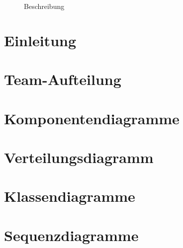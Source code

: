 \documentclass{report}
\begin{document}
	
	\begin{figure}[h]
		\centering
		\caption{Beschreibung}
		\label{fig:x}
	\end{figure}
		
	
	\tableofcontents 
	
	\chapter{Einleitung}\label{chp:einleitung}
	\thispagestyle{fancy}
	
	
	\chapter{Team-Aufteilung}
	\thispagestyle{fancy}
	
	
	\chapter{Komponentendiagramme}\label{chp:komponentendiagramme}
	\thispagestyle{fancy}
	
	
	\chapter{Verteilungsdiagramm}\label{chp:verteilungsdiagramm}
	\thispagestyle{fancy}
	
		
	\chapter{Klassendiagramme}\label{chp:klassendiagramme}
	\thispagestyle{fancy}
	
	
	\chapter{Sequenzdiagramme}\label{chp:sequenzdiagramme}
	\thispagestyle{fancy}
	
	
	
	
\end{document}
